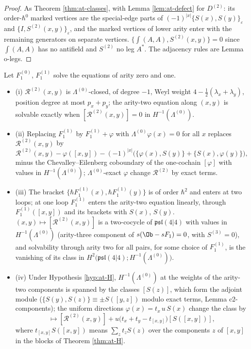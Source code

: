 \begin{proof}
As Theorem \ref{thm:at-classes}, with Lemma \ref{lem:at-defect} for $D^{(2)}$: its order-$\hbar^0$ marked vertices are the special-edge parts of $(-1)^{|x|}\{S(x),S(y)\}_\varepsilon$ and $\{I,S^{(2)}(x,y)\}_\varepsilon$, and the marked vertices of lower arity enter with the remaining generators on separate vertices. $\{\int(A,A),S^{(2)}(x,y)\}=0$ since $\int(A,A)$ has no antifield and $S^{(2)}$ no leg $A^*$. The adjacency rules are Lemma o-legs.
\end{proof}

\begin{theorem}
\label{thm:at-eq2}
Let $F_1^{(0)}$, $F_1^{(1)}$ solve the equations of arity zero and one.
\begin{itemize}
\item (i) $\mathcal R^{(2)}(x,y)$ is $\Lambda^{(0)}$-closed, of degree $-1$, Weyl weight $4-\tfrac12(\lambda_x+\lambda_y)$, position degree at most $p_x+p_y$; the arity-two equation along $(x,y)$ is solvable exactly when $[\mathcal R^{(2)}(x,y)]=0$ in $H^{-1}(\Lambda^{(0)})$.
\item (ii) Replacing $F_1^{(1)}$ by $F_1^{(1)}+\varphi$ with $\Lambda^{(0)}\varphi(x)=0$ for all $x$ replaces $\mathcal R^{(2)}(x,y)$ by
\[
\mathcal R^{(2)}(x,y)-\varphi([x,y])-(-1)^{|x|}\big(\{\varphi(x),S(y)\}+\{S(x),\varphi(y)\}\big),
\]
minus the Chevalley--Eilenberg coboundary of the one-cochain $[\varphi]$ with values in $H^{-1}(\Lambda^{(0)})$; $\Lambda^{(0)}$-exact $\varphi$ change $\mathcal R^{(2)}$ by exact terms.
\item (iii) The bracket $\{\hbar F_1^{(1)}(x),\hbar F_1^{(1)}(y)\}$ is of order $\hbar^2$ and enters at two loops; at one loop $F_1^{(1)}$ enters the arity-two equation linearly, through $F_1^{(1)}([x,y])$ and its brackets with $S(x)$, $S(y)$. $(x,y)\mapsto[\mathcal R^{(2)}(x,y)]$ is a two-cocycle of $\mathfrak{psl}(4|4)$ with values in $H^{-1}(\Lambda^{(0)})$ (arity-three component of $s(\Ob-sF_1)=0$, with $S^{(3)}=0$), and solvability through arity two for all pairs, for some choice of $F_1^{(1)}$, is the vanishing of its class in $H^2\big(\mathfrak{psl}(4|4);H^{-1}(\Lambda^{(0)})\big)$.
\item (iv) Under Hypothesis \ref{hyp:at-H}, $H^{-1}(\Lambda^{(0)})$ at the weights of the arity-two components is spanned by the classes $[S(z)]$, which form the adjoint module ($\{S(y),S(z)\}\equiv\pm S([y,z])$ modulo exact terms, Lemma c2-components); the uniform directions $\varphi(x)=t_x\,u\,S(x)$ change the class by
\begin{equation}
[\mathcal R^{(2)}(x,y)]\longmapsto[\mathcal R^{(2)}(x,y)]+u\big(t_x+t_y-t_{[x,y]}\big)[S([x,y])],
\label{eq:at-tshift}
\end{equation}
where $t_{[x,y]}S([x,y])$ means $\sum_z t_zS(z)$ over the components $z$ of $[x,y]$ in the blocks of Theorem \ref{thm:at-H}.
\end{itemize}
\end{theorem}

